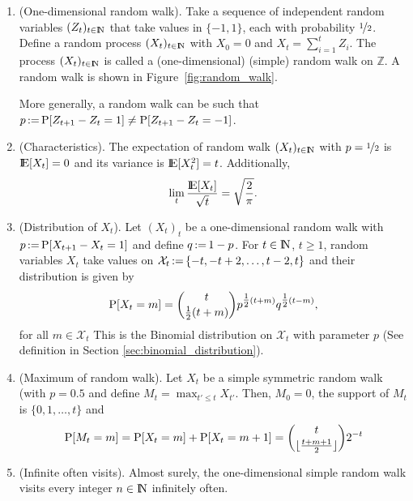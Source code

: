 \documentclass[a4paper,10pt]{scrbook}
\begin{document}
\begin{enumerate}
 \item (One-dimensional random walk). Take a sequence of independent random variables \((Z_{t})_{t\in\N}\) that take 
       values in \(\{-1, 1\}\), each with probability \(\nicefrac{1}{2}\). Define a random process 
       \((X_t)_{t\in \N}\) with \(X_0=0\) and \(X_t = \sum_{i=1}^{t}Z_i\). The process \((X_t)_{t\in \N}\) is called
       a (one-dimensional) (simple) random walk on \(\mathbb{Z}\). A random walk is shown in Figure~\ref{fig:random_walk}.              
       
       More generally, a random walk can be such that \(p{}\mathop{\mathrel{:}=}{}\mathrm{P}[Z_{t+1} - Z_{t} = 1] \neq \mathrm{P}[Z_{t+1} - Z_{t} = -1]\).
       
       
       
 \item (Characteristics). The expectation of random walk \((X_t)_{t\in\N}\) with \(p=\nicefrac{1}{2}\) 
       is \(\E[X_t]=0\) and its variance is \(\E[X_t^2] = t\). Additionally,
       \[
        \lim_{t}\frac{\E[X_t]}{\sqrt{t}} = \sqrt{\frac{2}{\pi}}.
       \]              



 \item (Distribution of \(X_t\)). Let \((X_t)_t\) be a one-dimensional random walk with 
       \(p{}\mathop{\mathrel{:}=}{} \mathrm{P}[X_{t+1} - X_{t} = 1]\) and define \(q {}\mathop{\mathrel{:}=}{} 1-p\). 
       For \(t\in\N\), \(t\geq 1\), random variables \(X_t\) take values on 
       \(\mathcal{X}_t {}\mathop{\mathrel{:}=}{} \{-t, -t+2, \ldots, t-2, t\}\) and their distribution is given by
       \[
        \mathrm{P}[X_t = m] = {t \choose \tfrac{1}{2}(t+m)} p^{\tfrac{1}{2}(t+m)} q^{\tfrac{1}{2}(t-m)},
       \]
       for all \(m \in \mathcal{X}_t\)
       This is the Binomial distribution on \(\mathcal{X}_t\) with parameter \(p\) 
       (See definition in Section \ref{sec:binomial_distribution}).
       
 \item (Maximum of random walk). Let \(X_t\) be a simple symmetric random walk (with \(p=0.5\)
       and define \(M_t = \max_{t'\leq t}X_{t'}\). Then, \(M_0=0\), the support of \(M_t\) is 
       \(\{0,1,\ldots, t\}\) and 
       \[
        \mathrm{P}[M_t = m] = \mathrm{P}[X_t = m] + \mathrm{P}[X_t = m+1] = {t \choose {\lfloor \tfrac{t+m+1}{2}\rfloor} }2^{-t}
       \]
       
 \item (Infinite often visits). 
       Almost surely, the one-dimensional simple random walk visits every integer $n\in\N$
       infinitely often.
       

\end{enumerate}
\end{document}
